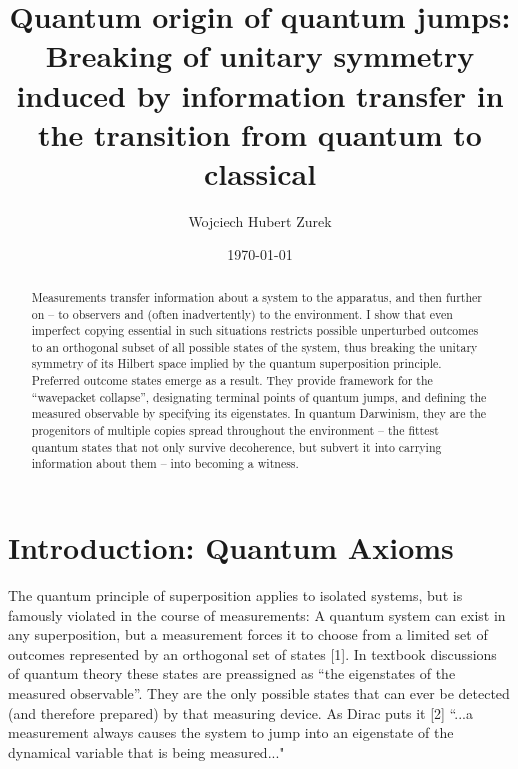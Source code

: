 \documentclass[aps,twocolumn,pra]{revtex4}
\newcommand{\+}         {\dagger}
\begin{document}
\title{Quantum origin of quantum jumps: Breaking of unitary symmetry induced by information transfer in the transition from quantum to classical }
\author{Wojciech Hubert Zurek}

 \address{Theory Division, MS B213, LANL
    Los Alamos, NM, 87545, U.S.A.}

\date{\today}

\begin{abstract}
Measurements transfer information about a system to the apparatus, and then further on -- to observers 
and (often inadvertently) to the environment. I show that even imperfect copying essential in such 
situations restricts possible unperturbed outcomes to an orthogonal subset of all possible states 
of the system, thus breaking the unitary symmetry of its Hilbert space implied by the quantum superposition principle. Preferred outcome states emerge as a result. They provide framework 
for the ``wavepacket collapse'', designating terminal points of quantum jumps, and defining the
measured observable by specifying its eigenstates. In quantum Darwinism, they are the progenitors of multiple copies spread throughout the environment -- the fittest quantum states that not only survive 
decoherence, but subvert it into carrying information about them -- into becoming a witness.

\end{abstract}

\maketitle

\section{Introduction: Quantum Axioms}
The quantum principle of superposition applies to isolated systems, but is famously violated 
in the course of measurements: A quantum system can exist in any superposition, but a measurement 
forces it to choose from a limited set of outcomes represented by an orthogonal set of states [1]. 
In textbook discussions of quantum theory these states are preassigned as ``the eigenstates of the measured observable''. They are the only possible states that can ever be detected (and therefore 
prepared) by that measuring device. As Dirac puts it [2]  ``...a measurement always causes 
the system to jump into an eigenstate of the dynamical variable that is being measured..." 
\end{document}
